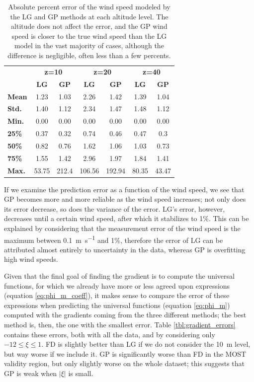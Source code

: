 \documentclass[a4paper,11pt]{kth-mag}
\begin{document}
\begin{table}[]
\centering
\caption{Absolute percent error of the wind speed modeled by the LG and GP methods at each altitude level. The altitude does not affect the error, and the GP wind speed is closer to the true wind speed than the LG model in the vast majority of cases, although the difference is negligible, often less than a few percents.}
\label{tbl:model_wind_errors}
\begin{tabular*}{\textwidth}{l |@{\extracolsep{\fill}} cc|cc|cc}
\toprule
& \multicolumn{2}{c|}{ \textbf{z=10} } & \multicolumn{2}{c|}{ \textbf{z=20 }} & \multicolumn{2}{c}{ \textbf{z=40} } \\
& \textbf{LG} & \textbf{GP} & \textbf{LG} & \textbf{GP} & \textbf{LG} & \textbf{GP} \\
\midrule 
\textbf{Mean} & 1.23 & 1.03 & 2.26 & 1.42 & 1.39 & 1.04 \\
\textbf{Std.} & 1.40 & 1.12 & 2.34 & 1.47 & 1.48 & 1.12 \\
\textbf{Min.} & 0.00 & 0.00 & 0.00 & 0.00 & 0.00 & 0.00 \\
\textbf{25\%} & 0.37 & 0.32 & 0.74 & 0.46 & 0.47 & 0.3  \\
\textbf{50\%} & 0.82 & 0.76 & 1.62 & 1.06 & 1.03 & 0.73 \\
\textbf{75\%} & 1.55 & 1.42 & 2.96 & 1.97 & 1.84 & 1.41 \\
\textbf{Max.} & 53.75 & 212.4 & 106.56 & 192.94 & 80.35 & 43.47 \\
\bottomrule
\end{tabular*} 
\end{table}


If we examine the prediction error as a function of the wind speed, we see that GP becomes more and more reliable as the wind speed increases; not only does its error decrease, so does the variance of the error. LG's error, however, decreases until a certain wind speed, after which it stabilizes to 1\%. This can be explained by considering that the measurement error of the wind speed is the maximum between \SI{0.1}{\meter\per\second} and 1\%, therefore the error of LG can be attributed almost entirely to uncertainty in the data, whereas GP is overfitting high wind speeds.

Given that the final goal of finding the gradient is to compute the universal functions, for which we already have more or less agreed upon expressions (equation \ref{eq:phi_m_coeff}), it makes sense to compare the error of these expressions when predicting the universal functions (equation \ref{eq:phi_m}) computed with the gradients coming from the three different methods; the best method is, then, the one with the smallest error. Table \ref{tbl:gradient_errors} contains these errors, both with all the data, and by considering only $-12\leq\xi\leq 1$. FD is slightly better than LG if we do not consider the \SI{10}{\meter} level, but way worse if we include it. GP is significantly worse than FD in the MOST validity region, but only slightly worse on the whole dataset; this suggests that GP is weak when $\vert\xi\vert$ is small. 
\end{document}
